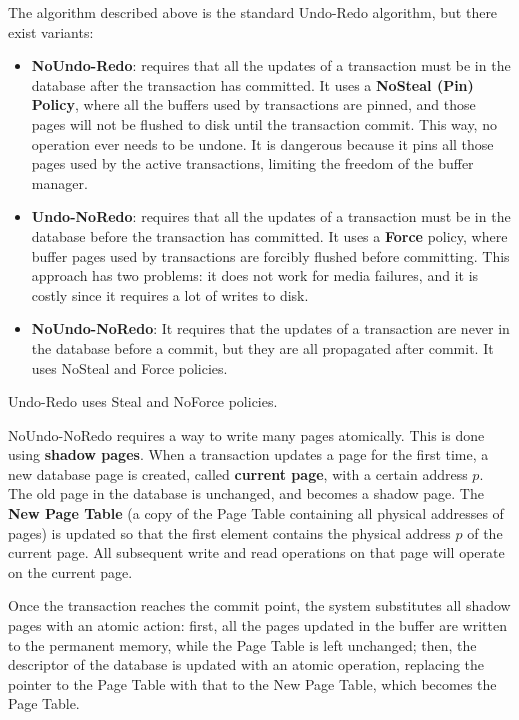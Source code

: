 The algorithm described above is the standard Undo-Redo algorithm, but there exist variants:
\begin{itemize}
    \item \textbf{NoUndo-Redo}: requires that all the updates of a transaction must be in the database after the transaction has committed. It uses a \textbf{NoSteal (Pin) Policy}, where all the buffers used by transactions are pinned, and those pages will not be flushed to disk until the transaction commit. This way, no operation ever needs to be undone. It is dangerous because it pins all those pages used by the active transactions, limiting the freedom of the buffer manager.

    \item \textbf{Undo-NoRedo}: requires that all the updates of a transaction must be in the database before the transaction has committed. It uses a \textbf{Force} policy, where buffer pages used by transactions are forcibly flushed before committing. This approach has two problems: it does not work for media failures, and it is costly since it requires a lot of writes to disk.

    \item \textbf{NoUndo-NoRedo}:  It requires that the updates of a transaction are never in the database before a commit, but they are all propagated after commit. It uses NoSteal and Force policies.
\end{itemize}
Undo-Redo uses Steal and NoForce policies.

NoUndo-NoRedo requires a way to write many pages atomically. This is done using \textbf{shadow pages}. When a transaction updates a page for the first time, a new database page is created, called \textbf{current page}, with a certain address $p$. The old page in the database is unchanged, and becomes a shadow page. The \textbf{New Page Table} (a copy of the Page Table containing all physical addresses of pages) is updated so that the first element contains the physical address $p$ of the current page. All subsequent write and read operations on that page will operate on the current page.

Once the transaction reaches the commit point, the system substitutes all shadow pages with an atomic action: first, all the pages updated in the buffer are written to the permanent memory, while the Page Table is left unchanged; then, the descriptor of the database is updated with an atomic operation, replacing the pointer to the Page Table with that to the New Page Table, which becomes the Page Table.

